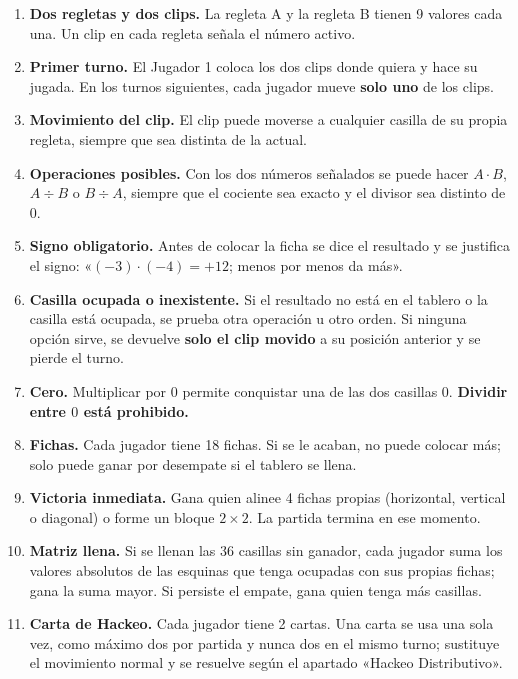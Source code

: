 \documentclass[12pt, letterpaper]{article}
\begin{document}
\begin{enumerate}[leftmargin=*]
  \item \textbf{Dos regletas y dos clips.} La regleta A y la regleta B tienen 9 valores cada una. Un clip en cada regleta señala el número activo.
  \item \textbf{Primer turno.} El Jugador 1 coloca los dos clips donde quiera y hace su jugada. En los turnos siguientes, cada jugador mueve \textbf{solo uno} de los clips.
  \item \textbf{Movimiento del clip.} El clip puede moverse a cualquier casilla de su propia regleta, siempre que sea distinta de la actual.
  \item \textbf{Operaciones posibles.} Con los dos números señalados se puede hacer $A\cdot B$, $A\div B$ o $B\div A$, siempre que el cociente sea exacto y el divisor sea distinto de $0$.
  \item \textbf{Signo obligatorio.} Antes de colocar la ficha se dice el resultado y se justifica el signo: «$(-3)\cdot(-4)=+12$; menos por menos da más».
  \item \textbf{Casilla ocupada o inexistente.} Si el resultado no está en el tablero o la casilla está ocupada, se prueba otra operación u otro orden. Si ninguna opción sirve, se devuelve \textbf{solo el clip movido} a su posición anterior y se pierde el turno.
  \item \textbf{Cero.} Multiplicar por $0$ permite conquistar una de las dos casillas $0$. \textbf{Dividir entre $0$ está prohibido.}
  \item \textbf{Fichas.} Cada jugador tiene 18 fichas. Si se le acaban, no puede colocar más; solo puede ganar por desempate si el tablero se llena.
  \item \textbf{Victoria inmediata.} Gana quien alinee 4 fichas propias (horizontal, vertical o diagonal) o forme un bloque $2\times 2$. La partida termina en ese momento.
  \item \textbf{Matriz llena.} Si se llenan las 36 casillas sin ganador, cada jugador suma los valores absolutos de las esquinas que tenga ocupadas con sus propias fichas; gana la suma mayor. Si persiste el empate, gana quien tenga más casillas.
  \item \textbf{Carta de Hackeo.} Cada jugador tiene 2 cartas. Una carta se usa una sola vez, como máximo dos por partida y nunca dos en el mismo turno; sustituye el movimiento normal y se resuelve según el apartado «Hackeo Distributivo».
\end{enumerate}
\end{document}
